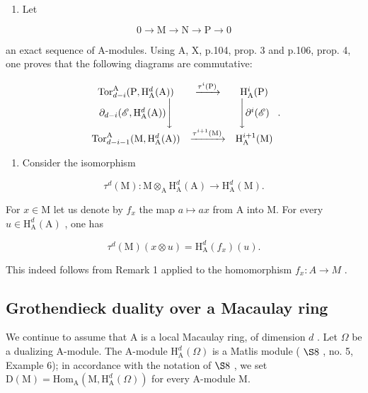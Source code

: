 \begin{enumerate}
\def\labelenumi{\arabic{enumi})}
\setcounter{enumi}{1}
\tightlist
\item
  Let
\end{enumerate}

\[
0 \to \mathrm{M} \to \mathrm{N} \to \mathrm{P} \to 0\tag{ℰ}
\]

an exact sequence of A-modules. Using A, X, p.104, prop. 3 and p.106, prop. 4, one proves that the following diagrams are commutative:

\[
\begin{array}{c c c} \operatorname{Tor} _ {d - i} ^ {\mathrm{A}} (\mathrm{P}, \mathrm{H} _ {\mathrm{A}} ^ {d} (\mathrm{A})) & \xrightarrow {\tau^ {i} (\mathrm{P})} & \mathrm{H} _ {\mathrm{A}} ^ {i} (\mathrm{P}) \\ \partial_ {d - i} (\mathscr {E}, \mathrm{H} _ {\mathrm{A}} ^ {d} (\mathrm{A})) \Bigg \downarrow & & \Bigg \downarrow \partial^ {i} (\mathscr {E}) \\ \operatorname{Tor} _ {d - i - 1} ^ {\mathrm{A}} (\mathrm{M}, \mathrm{H} _ {\mathrm{A}} ^ {d} (\mathrm{A})) & \xrightarrow {\tau^ {i + 1} (\mathrm{M})} & \mathrm{H} _ {\mathrm{A}} ^ {i + 1} (\mathrm{M}) \end{array} .
\]

\begin{enumerate}
\def\labelenumi{\arabic{enumi})}
\setcounter{enumi}{2}
\tightlist
\item
  Consider the isomorphism
\end{enumerate}

\[
\tau^ {d} (\mathrm{M}): \mathrm{M} \otimes_ {\mathrm{A}} \mathrm{H} _ {\mathrm{A}} ^ {d} (\mathrm{A}) \longrightarrow \mathrm{H} _ {\mathrm{A}} ^ {d} (\mathrm{M}).
\]

For \(x \in \mathrm{M}\) let us denote by \(f_x\) the map \(a \mapsto ax\) from A into M. For every \(u \in \mathrm{H}_{\mathrm{A}}^{d}(\mathrm{A})\) , one has

\[
\tau^ {d} (\mathrm{M}) (x \otimes u) = \mathrm{H} _ {\mathrm{A}} ^ {d} (f _ {x}) (u).
\]

This indeed follows from Remark 1 applied to the homomorphism \(f_{x}:A\to M\) .

\subsection{Grothendieck duality over a Macaulay ring}

We continue to assume that A is a local Macaulay ring, of dimension \(d\) . Let \(\Omega\) be a dualizing A-module. The A-module \(\mathrm{H}_{\mathrm{A}}^{d}(\Omega)\) is a Matlis module ( \(\S 8\) , no. 5, Example 6); in accordance with the notation of \(\S 8\) , we set \(\mathrm{D(M)} = \mathrm{Hom}_{\mathrm{A}}(\mathrm{M}, \mathrm{H}_{\mathrm{A}}^{d}(\Omega))\) for every A-module M.

